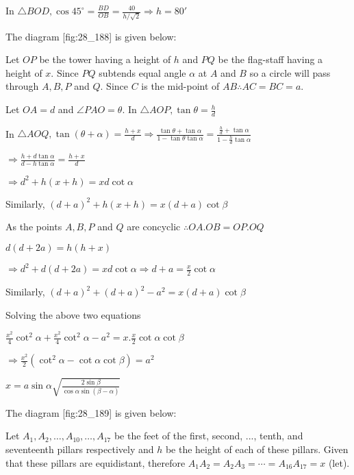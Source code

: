   In $\triangle BOD, \cos45^\circ = \frac{BD}{OB} = \frac{40}{h/\sqrt{2}}\Rightarrow h = 80'$

\item The diagram [fig:28_188] is given below:

  \startplacefigure[reference=fig:28_188]
    \externalfigure[28_188.pdf]
  \stopplacefigure

  Let $OP$ be the tower having a height of $h$ and $PQ$ be the flag-staff having a
  height of $x$. Since $PQ$ subtends equal angle $\alpha$ at $A$ and $B$ so
  a circle will pass through $A, B, P$ and $Q$. Since $C$ is the mid-point of $AB
  \therefore AC = BC = a$.

  Let $OA = d$ and $\angle PAO = \theta$. In $\triangle AOP, \tan\theta = \frac{h}{d}$

  In $\triangle AOQ, \tan(\theta + \alpha) = \frac{h + x}{d} \Rightarrow \frac{\tan\theta +
    \tan\alpha}{1 - \tan\theta\tan\alpha} = \frac{\frac{h}{d} + \tan\alpha}{1 - \frac{h}{d}\tan\alpha}$

  $\Rightarrow \frac{h + d\tan\alpha}{d - h\tan\alpha} = \frac{h + x}{d}$

  $\Rightarrow d^2 + h(x + h) = xd\cot\alpha$

  Similarly, $(d + a)^2 + h(x + h) = x(d + a)\cot\beta$

  As the points $A, B, P$ and $Q$ are concyclic $\therefore OA.OB = OP.OQ$

  $d(d + 2a) = h(h + x)$

  $\Rightarrow d^2 + d(d + 2a) = xd\cot\alpha \Rightarrow d + a = \frac{x}{2}\cot\alpha$

  Similarly, $(d + a)^2 + (d + a)^2 - a^2 = x(d + a)\cot\beta$

  Solving the above two equations

  $\frac{x^2}{4}\cot^2\alpha + \frac{x^2}{4}\cot^2\alpha - a^2 = x.\frac{x}{2}\cot\alpha\cot\beta$

  $\Rightarrow \frac{x^2}{2}(\cot^2\alpha - \cot\alpha\cot\beta) = a^2$

  $x = a\sin\alpha\sqrt{\frac{2\sin\beta}{\cos\alpha\sin(\beta - \alpha)}}$

\item The diagram [fig:28_189] is given below:

  \startplacefigure[reference=fig:28_189]
    \externalfigure[28_189.pdf]
  \stopplacefigure

  Let $A_1, A_2, \ldots, A_{10}, \ldots, A_{17}$ be the feet of the first, second, ..., tenth, and
  seventeenth pillars respectively and $h$ be the height of each of these pillars. Given that these
  pillars are equidistant, therefore $A_1A_2 = A_2A_3 = \cdots = A_{16}A_{17} = x$ (let).


